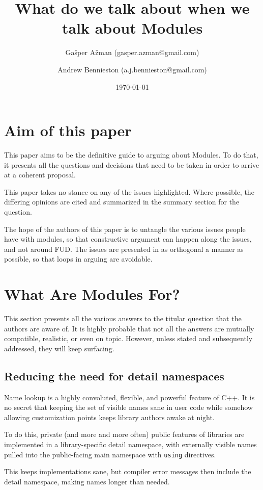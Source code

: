 \documentclass[reqno]{article}
\title{What do we talk about when we talk about Modules}
\author{Gašper Ažman \small{(gasper.azman@gmail.com)}
\and Andrew Bennieston \small{(a.j.bennieston@gmail.com)}}
\date{\today}
\begin{document}
\maketitle
\begin{multicols}{2}
\section{Aim of this paper}

This paper aims to be the definitive guide to arguing about Modules. To do
that, it presents all the questions and decisions that need to be taken in
order to arrive at a coherent proposal.

This paper takes no stance on any of the issues highlighted. Where possible, the
differing opinions are cited and summarized in the summary section for the
question.

The hope of the authors of this paper is to untangle the various issues people
have with modules, so that constructive argument can happen along the issues,
and not around FUD. The issues are presented in as orthogonal a manner as
possible, so that loops in arguing are avoidable.


\section{What Are Modules For?}

This section presents all the various answers to the titular question that the
authors are aware of. It is highly probable that not all the answers are
mutually compatible, realistic, or even on topic. However, unless stated and
subsequently addressed, they will keep surfacing.


\subsection{Reducing the need for detail namespaces}

Name lookup is a highly convoluted, flexible, and powerful feature of C++. It
is no secret that keeping the set of visible names sane in user code while
somehow allowing customization points keeps library authors awake at night. 

To do this, private (and more and more often) public features of libraries are
implemented in a library-specific detail namespace, with externally visible
names pulled into the public-facing main namespace with \texttt{using}
directives.

This keeps implementations sane, but compiler error messages then include the
detail namespace, making names longer than needed.


\end{multicols}
\end{document}
